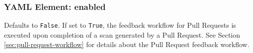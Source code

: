 \subsubsection{YAML Element: enabled}\label{sec:yaml-pull-request-enabled}
Defaults to \texttt{False}.  If set to \texttt{True}, the feedback workflow for Pull Requests is executed upon completion of a scan generated by
a Pull Request. See Section \ref{sec:pull-request-workflow} for details about the Pull Request feedback workflow.



